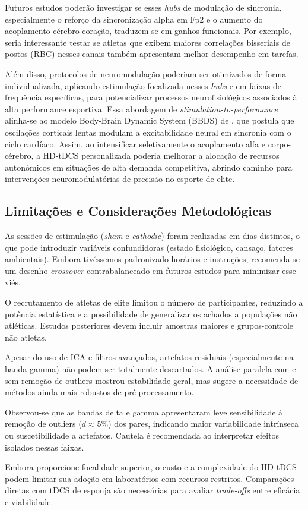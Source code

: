 Futuros estudos poderão investigar se esses \emph{hubs} de modulação de sincronia, especialmente o reforço da sincronização alpha em Fp2 e o aumento do acoplamento cérebro-coração, traduzem-se em ganhos funcionais. Por exemplo, seria interessante testar se atletas que exibem maiores correlações bisseriais de postos (RBC) nesses canais também apresentam melhor desempenho em tarefas.

Além disso, protocolos de neuromodulação poderiam ser otimizados de forma individualizada, aplicando estimulação focalizada nesses \textit{hubs} e em faixas de frequência específicas, para potencializar processos neurofisiológicos associados à alta performance esportiva. Essa abordagem de \textit{stimulation-to-performance} alinha-se ao modelo Body-Brain Dynamic System (BBDS) de , que postula que oscilações corticais lentas modulam a excitabilidade neural em sincronia com o ciclo cardíaco. Assim, ao intensificar seletivamente o acoplamento alfa e corpo-cérebro, a HD-tDCS personalizada poderia melhorar a alocação de recursos autonômicos em situações de alta demanda competitiva, abrindo caminho para intervenções neuromodulatórias de precisão no esporte de elite.

\subsection{Limitações e Considerações Metodológicas}
As sessões de estimulação (\emph{sham} e \emph{cathodic}) foram realizadas em dias distintos, o que pode introduzir variáveis confundidoras (estado fisiológico, cansaço, fatores ambientais). Embora tivéssemos padronizado horários e instruções, recomenda-se um desenho \emph{crossover} contrabalanceado em futuros estudos para minimizar esse viés.

O recrutamento de atletas de elite limitou o número de participantes, reduzindo a potência estatística e a possibilidade de generalizar os achados a populações não atléticas. Estudos posteriores devem incluir amostras maiores e grupos-controle não atletas.

Apesar do uso de ICA e filtros avançados, artefatos residuais (especialmente na banda gamma) não podem ser totalmente descartados. A análise paralela com e sem remoção de outliers mostrou estabilidade geral, mas sugere a necessidade de métodos ainda mais robustos de pré-processamento.

Observou-se que as bandas delta e gamma apresentaram leve sensibilidade à remoção de outliers (\(d\approx5\)\%) dos pares, indicando maior variabilidade intrínseca ou suscetibilidade a artefatos. Cautela é recomendada ao interpretar efeitos isolados nessas faixas.

Embora proporcione focalidade superior, o custo e a complexidade do HD-tDCS podem limitar sua adoção em laboratórios com recursos restritos. Comparações diretas com tDCS de esponja são necessárias para avaliar \textit{trade-offs} entre eficácia e viabilidade.